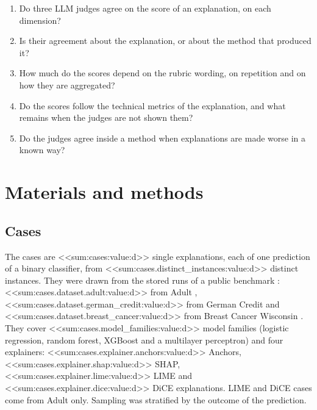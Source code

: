 \documentclass[12pt,letterpaper]{article}
\begin{document}
\begin{enumerate}
\item Do three LLM judges agree on the score of an explanation, on each dimension?
\item Is their agreement about the explanation, or about the method that produced it?
\item How much do the scores depend on the rubric wording, on repetition and on how they
are aggregated?
\item Do the scores follow the technical metrics of the explanation, and what remains
when the judges are not shown them?
\item Do the judges agree inside a method when explanations are made worse in a known way?
\end{enumerate}

\section{Materials and methods}

\subsection{Cases}

The cases are <<sum:cases:value:d>> single explanations, each of one prediction of a
binary classifier, from <<sum:cases.distinct_instances:value:d>> distinct instances. They
were drawn from the stored runs of a public benchmark \cite{herrera2026framework}:
<<sum:cases.dataset.adult:value:d>> from Adult \cite{becker1996adult},
<<sum:cases.dataset.german_credit:value:d>> from German Credit \cite{hofmann1994statlog}
and <<sum:cases.dataset.breast_cancer:value:d>> from Breast Cancer Wisconsin
\cite{wolberg1993breast}. They cover <<sum:cases.model_families:value:d>> model families
(logistic regression, random forest, XGBoost and a multilayer perceptron) and four
explainers: <<sum:cases.explainer.anchors:value:d>> Anchors,
<<sum:cases.explainer.shap:value:d>> SHAP, <<sum:cases.explainer.lime:value:d>> LIME and
<<sum:cases.explainer.dice:value:d>> DiCE explanations. LIME and DiCE cases come from
Adult only. Sampling was stratified by the outcome of the prediction.
\end{document}
